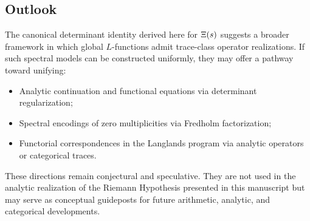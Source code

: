 \subsection*{Outlook}

The canonical determinant identity derived here for \( \Xi(s) \) suggests a broader framework in which global \( L \)-functions admit trace-class operator realizations. If such spectral models can be constructed uniformly, they may offer a pathway toward unifying:

\begin{itemize}
  \item Analytic continuation and functional equations via determinant regularization;
  \item Spectral encodings of zero multiplicities via Fredholm factorization;
  \item Functorial correspondences in the Langlands program via analytic operators or categorical traces.
\end{itemize}

These directions remain conjectural and speculative. They are not used in the analytic realization of the Riemann Hypothesis presented in this manuscript but may serve as conceptual guideposts for future arithmetic, analytic, and categorical developments.
